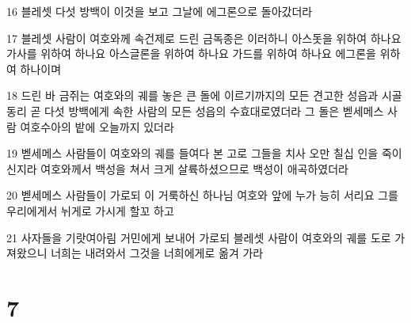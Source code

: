 \par 16 블레셋 다섯 방백이 이것을 보고 그날에 에그론으로 돌아갔더라
\par 17 블레셋 사람이 여호와께 속건제로 드린 금독종은 이러하니 아스돗을 위하여 하나요 가사를 위하여 하나요 아스글론을 위하여 하나요 가드를 위하여 하나요 에그론을 위하여 하나이며
\par 18 드린 바 금쥐는 여호와의 궤를 놓은 큰 돌에 이르기까지의 모든 견고한 성읍과 시골 동리 곧 다섯 방백에게 속한 사람의 모든 성읍의 수효대로였더라 그 돌은 벧세메스 사람 여호수아의 밭에 오늘까지 있더라
\par 19 벧세메스 사람들이 여호와의 궤를 들여다 본 고로 그들을 치사 오만 칠십 인을 죽이신지라 여호와께서 백성을 쳐서 크게 살륙하셨으므로 백성이 애곡하였더라
\par 20 벧세메스 사람들이 가로되 이 거룩하신 하나님 여호와 앞에 누가 능히 서리요 그를 우리에게서 뉘게로 가시게 할꼬 하고
\par 21 사자들을 기랏여아림 거민에게 보내어 가로되 블레셋 사람이 여호와의 궤를 도로 가져왔으니 너희는 내려와서 그것을 너희에게로 옮겨 가라

\chapter{7}

